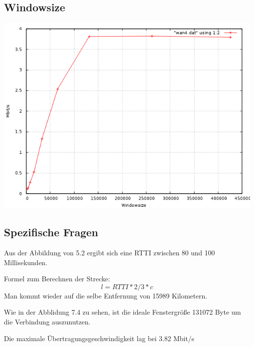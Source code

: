 \documentclass[a4paper,10pt]{article}
\begin{document}
\subsection{Windowsize}
\includegraphics[scale=0.75]{wan4_windows.png}

\subsection{Spezifische Fragen}
\begin{itemize} 
 \item Aus der Abbildung von 5.2 ergibt sich eine RTTI zwischen 80 und 100 Millisekunden.
 \item {Formel zum Berechnen der Strecke: 
 \begin{equation}
  l=RTTI*2/3*c
 \end{equation}
 Man kommt wieder auf die selbe Entfernung von 15989 Kilometern.
 \item Wie in der Abblidung 7.4 zu sehen, ist die ideale Fenstergröße 131072 Byte um die Verbindung auszunutzen.}
 \item Die maximale Übertragungsgeschwindigkeit lag bei 3.82 Mbit/s
\end{itemize}
 
\end{document}
